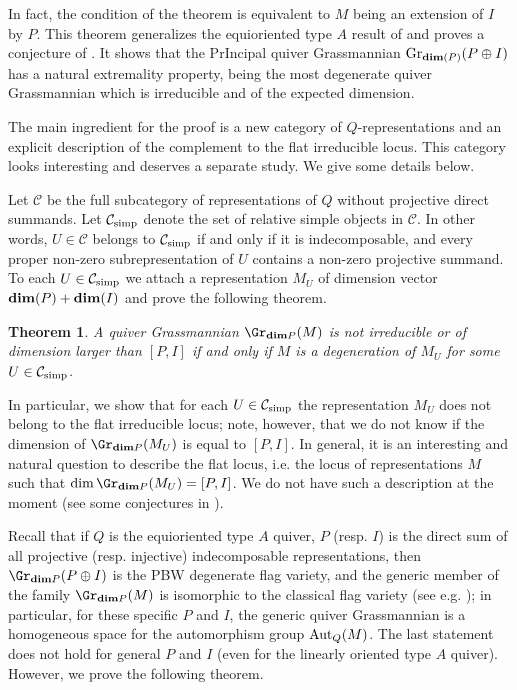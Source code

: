 \documentclass{amsart}
\newcommand{\bdim}{{\rm\bf dim}}
\newtheorem{theoremA}{Theorem}
\numberwithin{equation}{section}
\theoremstyle{remark}
\begin{document}
In fact, the condition of the theorem is equivalent to $M$ being an extension of $I$ by $P$. This theorem generalizes the equioriented type $A$ result of \cite{CFFFR17} and proves 
a conjecture of \cite{FedFe25,Fed25}. It shows that the PrIncipal quiver Grassmannian 
${\rm Gr}_{{\rm\bf dim}(P)}(P\oplus I)$ has a natural extremality property, being the 
most degenerate quiver Grassmannian which is irreducible and of the expected dimension.

The main ingredient for the proof is a new category
of $Q$-representations and an explicit description of the complement to the flat irreducible locus.
This category looks interesting and deserves a separate study. We give some details below.

Let $\mathcal{C}$ be the  full subcategory of representations of $Q$ without projective direct 
summands. Let $\mathcal{C}_{\rm simp}$ denote the set of relative simple objects in $\mathcal{C}$. 
In other words, $U\in\mathcal{C}$ belongs to $\mathcal{C}_{\rm simp}$ if and only if it is 
indecomposable, and every proper non-zero subrepresentation of $U$ contains a non-zero projective 
summand. To each $U\in \mathcal{C}_{\rm simp}$ we attach a representation $M_U$ of dimension vector 
$\bdim(P)+\bdim(I)$ and prove the following theorem.

\begin{theoremA}
A quiver Grassmannian $\Gr_{{\rm\bf dim} P}(M)$ is not irreducible or of  dimension larger than 
$[P,I]$ if and only if $M$ is a degeneration of $M_U$ for some 
$U\in \mathcal{C}_{\rm simp}$.
\end{theoremA}

In particular, we show that for each $U\in \mathcal{C}_{\rm simp}$ the representation
$M_U$ does not belong to the flat irreducible locus; note, however, that we do not know if the dimension of
$\Gr_{{\rm\bf dim} P}(M_U)$ is equal to $[P,I]$. In general, it is an interesting and natural
question to describe the flat locus, i.e. the locus of representations $M$ such that
$\dim \Gr_{{\rm \bf dim} P}(M_U)=[P,I]$. We do not have such a description at the moment
(see some conjectures in \cite{FedFe25}).

Recall that if $Q$ is the equioriented type $A$ quiver,
$P$ (resp. $I$) is the direct sum of all projective (resp. injective) indecomposable 
representations, then $\Gr_{{\rm\bf dim} P}(P\oplus I)$ is the PBW degenerate flag variety, and the 
generic member of the family $\Gr_{{\rm\bf dim} P}(M)$ is isomorphic to the classical flag
variety (see e.g. \cite{CFR12}); in particular, for these specific $P$ and $I$,  
the generic quiver Grassmannian is a homogeneous space for
the automorphism group ${\rm Aut}_Q(M)$. The last statement does not hold for general $P$ and $I$ 
(even for the linearly oriented type $A$ quiver).
However, we prove the following theorem.
\end{document}
